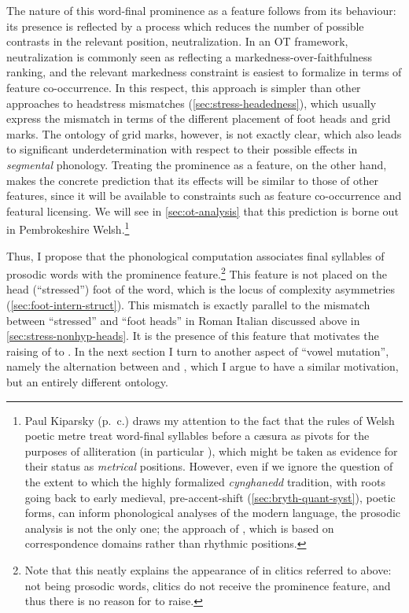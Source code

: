 The nature of this word\hyp final prominence as a feature follows from its behaviour: its presence is reflected by a process which reduces the number of possible contrasts in the relevant position, \ie neutralization. In an OT framework, neutralization is commonly seen as reflecting a markedness\hyp over\hyp faithfulness ranking, and the relevant markedness constraint is easiest to formalize in terms of feature co\hyp occurrence. In this respect, this approach is simpler than other approaches to head\dash stress mismatches (\cref{sec:stress-headedness}), which usually express the mismatch in terms of the different placement of foot heads and grid marks. The ontology of grid marks, however, is not exactly clear, which also leads to significant underdetermination with respect to their possible effects in \emph{segmental} phonology. Treating the prominence as a feature, on the other hand, makes the concrete prediction that its effects will be similar to those of other features, since it will be available to constraints such as feature co\hyp occurrence and featural licensing. We will see in \cref{sec:ot-analysis} that this prediction is borne out in Pembrokeshire Welsh.\footnote{Paul Kiparsky (p.~c.) draws my attention to the fact that the rules of Welsh poetic metre \citep[\egm][]{morris-jones25:_cerdd} treat word-final syllables before a cæsura as pivots for the purposes of alliteration (\cf in particular \citealt{griffen99}), which might be taken as evidence for their status as \emph{metrical} positions. However, even if we ignore the question of the extent to which the highly formalized \emph{cynghanedd} tradition, with roots going back to early medieval, \ie pre\hyp accent\hyp shift (\cref{sec:bryth-quant-syst}), poetic forms, can inform phonological analyses of the modern language, the prosodic analysis is not the only one; \cf the approach of \citet{hammondar:_welsh}, which is based on correspondence domains rather than rhythmic positions.}

Thus, I propose that the phonological computation associates final syllables of prosodic words with the prominence feature.\footnote{Note that this neatly explains the appearance of \ipa{[ə]} in clitics referred to above: not being prosodic words, clitics do not receive the prominence feature, and thus there is no reason for \ipa{[ə]} to raise.} This feature is not placed on the head (\enquote{stressed}) foot of the word, which is the locus of complexity asymmetries (\cref{sec:foot-intern-struct}). This mismatch is exactly parallel to the mismatch between \enquote{stressed} and \enquote{foot heads} in Roman Italian discussed above in \cref{sec:stress-nonhyp-heads}. It is the presence of this feature that motivates the raising of \ipa{[ə]} to \ipa{[i]}. In the next section I turn to another aspect of \enquote{vowel mutation}, namely the alternation between \ipa{[u]} and \ipa{[ə]}, which I argue to have a similar motivation, but an entirely different ontology.

